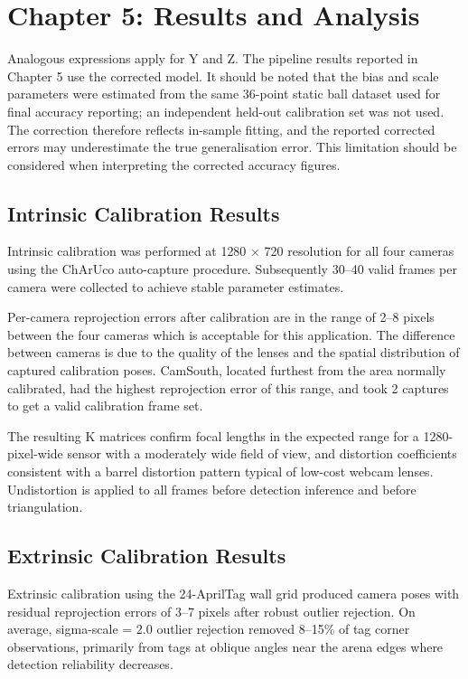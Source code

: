 \chapter{Chapter 5: Results and Analysis}

Analogous expressions apply for Y and Z. The pipeline results reported in Chapter 5 use the corrected model. It should be noted that the bias and scale parameters were estimated from the same 36-point static ball dataset used for final accuracy reporting; an independent held-out calibration set was not used. The correction therefore reflects in-sample fitting, and the reported corrected errors may underestimate the true generalisation error. This limitation should be considered when interpreting the corrected accuracy figures.

\section{Intrinsic Calibration Results}

Intrinsic calibration was performed at 1280 \(\times\) 720 resolution for all four cameras using the ChArUco auto-capture procedure. Subsequently 30--40 valid frames per camera were collected to achieve stable parameter estimates.

Per-camera reprojection errors after calibration are in the range of 2--8 pixels between the four cameras which is acceptable for this application. The difference between cameras is due to the quality of the lenses and the spatial distribution of captured calibration poses. CamSouth, located furthest from the area normally calibrated, had the highest reprojection error of this range, and took 2 captures to get a valid calibration frame set.

The resulting K matrices confirm focal lengths in the expected range for a 1280-pixel-wide sensor with a moderately wide field of view, and distortion coefficients consistent with a barrel distortion pattern typical of low-cost webcam lenses. Undistortion is applied to all frames before detection inference and before triangulation.

\section{Extrinsic Calibration Results}

Extrinsic calibration using the 24-AprilTag wall grid produced camera poses with residual reprojection errors of 3--7 pixels after robust outlier rejection. On average, sigma-scale = 2.0 outlier rejection removed 8--15\% of tag corner observations, primarily from tags at oblique angles near the arena edges where detection reliability decreases.

